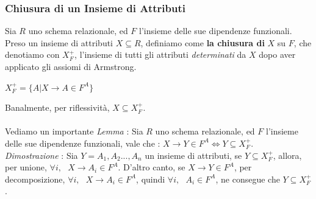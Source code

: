 \documentclass[12pt, letterpaper]{article}
\begin{document}
\subsubsection{Chiusura di un Insieme di Attributi}
Sia \(R\) uno schema relazionale, ed \(F\) l'insieme delle sue dipendenze funzionali. Preso un 
insieme di attributi \(X\subseteq R\), definiamo come \textbf{la chiusura di }\(X\) su \(F\), che denotiamo 
con \(X^+_F\), l'insieme di tutti gli attributi \textit{determinati} da \(X\) dopo aver applicato 
gli assiomi di Armstrong.\begin{center}
    \(X^+_F = \{A|X\rightarrow A \in F^A\}\)
\end{center}
Banalmente, per riflessività, \(X\subseteq X^+_F\).
\\\hphantom{}\\Vediamo un importante \textit{Lemma} : Sia \(R\) uno schema relazionale, ed \(F\) l'insieme delle sue dipendenze funzionali, 
vale che : \(X\rightarrow Y \in F^A \iff Y\subseteq X_F^+\). \\
\textit{Dimostrazione }: Sia \(Y=A_1,A_2...,A_n\) un insieme di attributi, se \(Y\subseteq X^+_F\), allora, 
per unione, \(\forall i, \text{ }X\rightarrow A_i\in F^A\). D'altro canto, se \(X\rightarrow Y \in F^A\), 
per decomposizione, \(\forall i, \text{ }X\rightarrow A_i\in F^A\), quindi \(\forall i, \text{ }A_i\in F^A\), 
ne consegue che \(Y\subseteq X_F^+\).
\end{document}
